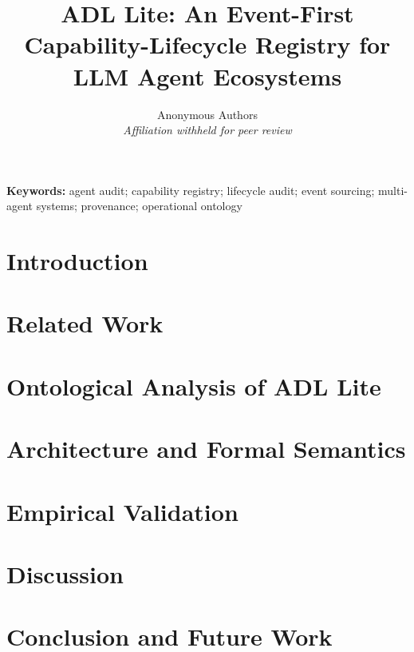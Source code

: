 \documentclass[11pt,a4paper]{article}
\title{ADL Lite: An Event-First Capability-Lifecycle Registry for LLM Agent Ecosystems}
\author{
    Anonymous Authors \\
    \textit{Affiliation withheld for peer review}
}
\date{}
\theoremstyle{definition}
\theoremstyle{remark}
\begin{document}
\maketitle

\begin{abstract}

\end{abstract}

\noindent\textbf{Keywords:}
agent audit; capability registry; lifecycle audit; event sourcing; multi-agent systems; provenance; operational ontology

\section{Introduction}\label{sec:introduction}


\section{Related Work}\label{sec:related-work}


\section{Ontological Analysis of ADL Lite}\label{sec:ontological-analysis}


\section{Architecture and Formal Semantics}\label{sec:architecture}


\section{Empirical Validation}\label{sec:empirical-validation}


\section{Discussion}\label{sec:discussion}


\section{Conclusion and Future Work}\label{sec:conclusion}

\end{document}
